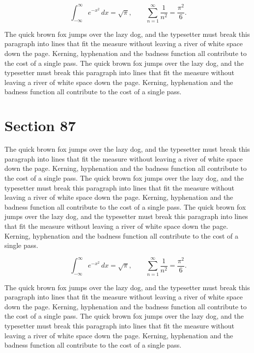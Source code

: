 \documentclass{article}
\begin{document}
\begin{equation}
\int_{-\infty}^{\infty} e^{-x^{2}}\,dx = \sqrt{\pi}, \qquad
\sum_{n=1}^{\infty} \frac{1}{n^{2}} = \frac{\pi^{2}}{6}.
\end{equation}

The quick brown fox jumps over the lazy dog, and the typesetter must break this paragraph into lines that fit the measure without leaving a river of white space down the page. Kerning, hyphenation and the badness function all contribute to the cost of a single pass. The quick brown fox jumps over the lazy dog, and the typesetter must break this paragraph into lines that fit the measure without leaving a river of white space down the page. Kerning, hyphenation and the badness function all contribute to the cost of a single pass. 
\section{Section 87}
The quick brown fox jumps over the lazy dog, and the typesetter must break this paragraph into lines that fit the measure without leaving a river of white space down the page. Kerning, hyphenation and the badness function all contribute to the cost of a single pass. The quick brown fox jumps over the lazy dog, and the typesetter must break this paragraph into lines that fit the measure without leaving a river of white space down the page. Kerning, hyphenation and the badness function all contribute to the cost of a single pass. The quick brown fox jumps over the lazy dog, and the typesetter must break this paragraph into lines that fit the measure without leaving a river of white space down the page. Kerning, hyphenation and the badness function all contribute to the cost of a single pass. 

\begin{equation}
\int_{-\infty}^{\infty} e^{-x^{2}}\,dx = \sqrt{\pi}, \qquad
\sum_{n=1}^{\infty} \frac{1}{n^{2}} = \frac{\pi^{2}}{6}.
\end{equation}

The quick brown fox jumps over the lazy dog, and the typesetter must break this paragraph into lines that fit the measure without leaving a river of white space down the page. Kerning, hyphenation and the badness function all contribute to the cost of a single pass. The quick brown fox jumps over the lazy dog, and the typesetter must break this paragraph into lines that fit the measure without leaving a river of white space down the page. Kerning, hyphenation and the badness function all contribute to the cost of a single pass. 
\end{document}
